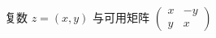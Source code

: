\documentclass[nofonts]{ctexart}
\begin{document}
复数 $ z = (x, y) $ 与可用矩阵
\begin{math}
	\left(
	\begin{smallmatrix}
		x & -y \\
		y & x  
	\end{smallmatrix}
	\right) 
\end{math}
\end{document}
